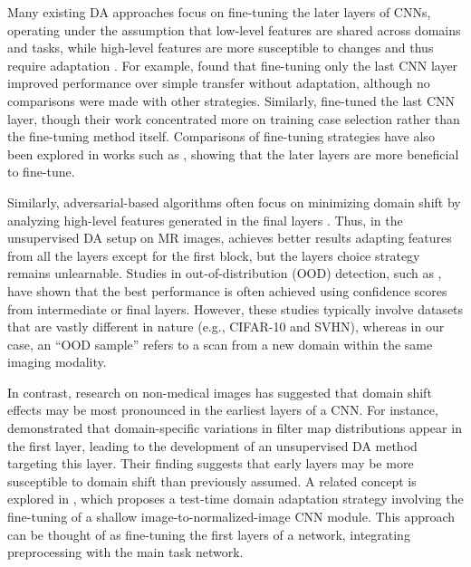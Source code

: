 Many existing DA approaches focus on fine-tuning the later layers of CNNs, operating under the assumption that low-level features are shared across domains and tasks, while high-level features are more susceptible to changes and thus require adaptation \cite{yosinski2014transferable}. For example, \cite{kushibar2019supervised} found that fine-tuning only the last CNN layer improved performance over simple transfer without adaptation, although no comparisons were made with other strategies. Similarly, \cite{valindria2018domain} fine-tuned the last CNN layer, though their work concentrated more on training case selection rather than the fine-tuning method itself. Comparisons of fine-tuning strategies have also been explored in works such as \cite{valverde2019one,ghafoorian2017transfer}, showing that the later layers are more beneficial to fine-tune.

Similarly, adversarial-based algorithms often focus on minimizing domain shift by analyzing high-level features generated in the final layers \cite{ganin2015unsupervised}. Thus, in the unsupervised DA setup on MR images, \cite{kamnitsas2017unsupervised} achieves better results adapting features from all the layers except for the first block, but the layers choice strategy remains unlearnable. Studies in out-of-distribution (OOD) detection, such as \cite{lee2018simple,erdil2020unsupervised}, have shown that the best performance is often achieved using confidence scores from intermediate or final layers. However, these studies typically involve datasets that are vastly different in nature (e.g., CIFAR-10 and SVHN), whereas in our case, an ``OOD sample'' refers to a scan from a new domain within the same imaging modality.

In contrast, research on non-medical images has suggested that domain shift effects may be most pronounced in the earliest layers of a CNN. For instance, \cite{aljundi2016lightweight} demonstrated that domain-specific variations in filter map distributions appear in the first layer, leading to the development of an unsupervised DA method targeting this layer. Their finding suggests that early layers may be more susceptible to domain shift than previously assumed. A related concept is explored in \cite{karani2021test}, which proposes a test-time domain adaptation strategy involving the fine-tuning of a shallow image-to-normalized-image CNN module. This approach can be thought of as fine-tuning the first layers of a network, integrating preprocessing with the main task network.

